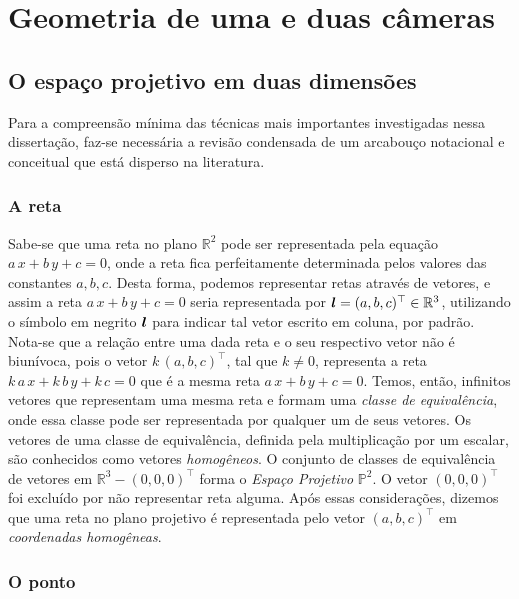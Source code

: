 \newpage
\section{Geometria de uma e duas câmeras}\label{sec.geo-1-2-cam}

\subsection{O espaço projetivo em duas dimensões}\label{sec.espaco-P2}

Para a compreensão mínima das técnicas mais importantes investigadas nessa dissertação, faz-se necessária a revisão condensada de um arcabouço notacional e conceitual que está disperso na literatura.

\subsubsection{A reta}\label{sec.reta}


Sabe-se que uma reta no plano $\mathbb{R}^{2}$ pode ser representada pela equação $a\,x+b\,y+c=0$, onde a reta fica perfeitamente determinada pelos valores das constantes $a,b,c$. Desta forma, podemos representar retas através de vetores, e assim a reta $a\,x+b\,y+c=0$ seria representada por $\boldsymbol{l} = (a,b,c)^\top \in \mathbb{R}^{3}$, utilizando o símbolo em negrito $\boldsymbol{l}$ para indicar tal vetor escrito em coluna, por padrão. Nota-se que a relação entre uma dada reta e o seu respectivo vetor não é biunívoca, pois o vetor $k\,(a,b,c)^\top$, tal que $k\neq 0$, representa a reta $k\,a\,x+k\,b\,y+k\,c=0$ que é a mesma reta $a\,x+b\,y+c=0$. Temos, então, infinitos vetores que representam uma mesma reta e formam uma {\it classe de equivalência}, onde essa classe pode ser representada por qualquer um de seus vetores. Os vetores de uma classe de equivalência, definida pela multiplicação por um escalar, são conhecidos como vetores {\it homogêneos}. O conjunto de classes de equivalência de vetores em $\mathbb{R}^{3} - (0,0,0)^\top$ forma o {\it Espaço Projetivo} $\mathbb{P}^{2}$. O vetor $(0,0,0)^\top$ foi excluído por não representar reta alguma. Após essas considerações, dizemos que uma reta no plano projetivo é representada pelo vetor $(a,b,c)^\top$ em {\it coordenadas homogêneas}.\\

\subsubsection{O ponto}\label{sec.ponto}


